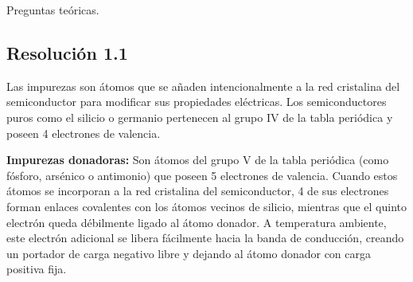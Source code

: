 \documentclass[
  11pt,
  letterpaper,
   addpoints,
   answers
  ]{exam}
\begin{document}
\begin{questions}
    \question Preguntas teóricas.

\begin{solution}
\subsection*{Resolución 1.1}
Las impurezas son átomos que se añaden intencionalmente a la red cristalina del semiconductor para modificar sus propiedades eléctricas. Los semiconductores puros como el silicio o germanio pertenecen al grupo IV de la tabla periódica y poseen 4 electrones de valencia.

\textbf{Impurezas donadoras:} Son átomos del grupo V de la tabla periódica (como fósforo, arsénico o antimonio) que poseen 5 electrones de valencia. Cuando estos átomos se incorporan a la red cristalina del semiconductor, 4 de sus electrones forman enlaces covalentes con los átomos vecinos de silicio, mientras que el quinto electrón queda débilmente ligado al átomo donador. A temperatura ambiente, este electrón adicional se libera fácilmente hacia la banda de conducción, creando un portador de carga negativo libre y dejando al átomo donador con carga positiva fija.


\end{solution}
\end{questions}
\end{document}
